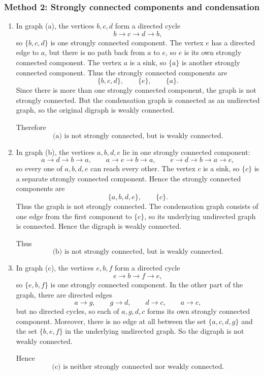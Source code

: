 \documentclass[12pt]{article}
\begin{document}
\subsubsection{Method 2: Strongly connected components and condensation}
\begin{enumerate}[label=(\alph*)]
\item In graph (a), the vertices \(b,c,d\) form a directed cycle
\[
b\to c\to d\to b,
\]
so \(\{b,c,d\}\) is one strongly connected component. The vertex \(e\) has a directed edge to \(a\), but there is no path back from \(a\) to \(e\), so \(e\) is its own strongly connected component. The vertex \(a\) is a sink, so \(\{a\}\) is another strongly connected component. Thus the strongly connected components are
\[
\{b,c,d\},\qquad \{e\},\qquad \{a\}.
\]
Since there is more than one strongly connected component, the graph is not strongly connected. But the condensation graph is connected as an undirected graph, so the original digraph is weakly connected.

Therefore
\[
\boxed{\text{(a) is not strongly connected, but is weakly connected.}}
\]

\item In graph (b), the vertices \(a,b,d,e\) lie in one strongly connected component:
\[
a\to d\to b\to a,\qquad a\to e\to b\to a,\qquad e\to d\to b\to a\to e,
\]
so every one of \(a,b,d,e\) can reach every other. The vertex \(c\) is a sink, so \(\{c\}\) is a separate strongly connected component. Hence the strongly connected components are
\[
\{a,b,d,e\},\qquad \{c\}.
\]
Thus the graph is not strongly connected. The condensation graph consists of one edge from the first component to \(\{c\}\), so its underlying undirected graph is connected. Hence the digraph is weakly connected.

Thus
\[
\boxed{\text{(b) is not strongly connected, but is weakly connected.}}
\]

\item In graph (c), the vertices \(e,b,f\) form a directed cycle
\[
e\to b\to f\to e,
\]
so \(\{e,b,f\}\) is one strongly connected component. In the other part of the graph, there are directed edges
\[
a\to g,\qquad g\to d,\qquad d\to c,\qquad a\to c,
\]
but no directed cycles, so each of \(a,g,d,c\) forms its own strongly connected component. Moreover, there is no edge at all between the set \(\{a,c,d,g\}\) and the set \(\{b,e,f\}\) in the underlying undirected graph. So the digraph is not weakly connected.

Hence
\[
\boxed{\text{(c) is neither strongly connected nor weakly connected.}}
\]
\end{enumerate}
\end{document}
